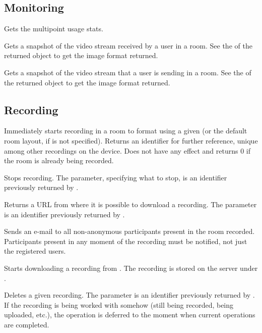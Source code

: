 \subsection{Monitoring}
\begin{Api}

Gets the multipoint usage stats.

Gets a snapshot of the video stream received by a user in a room. See the  of the returned object to get the image format returned.

Gets a snapshot of the video stream that a user is sending in a room. See the  of the returned object to get the image format returned.

\end{Api}


\subsection{Recording}
\begin{Api}

Immediately starts recording in a room to format  using a given  (or the default room layout, if  is not specified). Returns an identifier for further reference, unique among other recordings on the device. Does not have any effect and returns 0 if the room is already being recorded.

Stops recording. The  parameter, specifying what to stop, is an identifier previously returned by .

Returns a URL from where it is possible to download a recording. The  parameter is an identifier previously returned by .

Sends an e-mail to all non-anonymous participants present in the room recorded. Participants present in any moment of the recording must be notified, not just the registered users.

Starts downloading a recording from . The recording is stored on the server under .

Deletes a given recording. The  parameter is an identifier previously returned by . If the recording is being worked with somehow (still being recorded, being uploaded, etc.), the operation is deferred to the moment when current operations are completed.

\end{Api}



